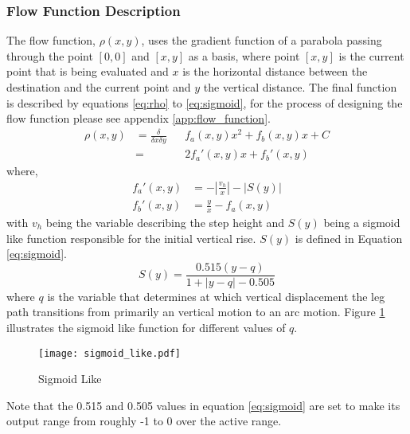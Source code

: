             \subsubsection{Flow Function Description} \label{sec:flow_function}
                The flow function, \(\rho(x,y)\), uses the gradient function of a parabola passing through the point \([0,0]\) and \([x,y]\) as a basis, where point \([x,y]\)
                is the current point that is being evaluated and \(x\) is the horizontal distance between the destination and the current point and \(y\) the
                vertical distance. The final function is described by equations \ref{eq:rho} to \ref{eq:sigmoid}, for the process of designing the flow function
                please see appendix \ref{app:flow_function}.
                \begin{equation} \label{eq:rho}
                    \begin{aligned}
                        \rho(x,y) &= \frac{\delta}{\delta x\delta y}&&f_a(x,y)x^2 + f_b(x,y)x + C\\
                        &= &&2f_a'(x,y)x + f_b'(x,y)    
                    \end{aligned}
                \end{equation}
                where, %
                \begin{align} \label{eq:fa}
                    f_a'(x,y) &= -\left|\frac{v_h}{x}\right| - \left|S(y)\right|\\
                    f_b'(x,y) &= \frac{y}{x} - f_a(x,y)
                \end{align}
                with \(v_h\) being the variable describing the step height and \(S(y)\) being a sigmoid like function 
                responsible for the initial vertical rise. \(S(y)\) is defined in Equation \ref{eq:sigmoid}.
                \begin{equation} \label{eq:sigmoid}
                    S(y) = \frac{0.515(y-q)}{1+\left|y-q\right|-0.505}
                \end{equation}
                where \(q\) is the variable that determines at which vertical displacement the leg path transitions from primarily an vertical motion to
                an arc motion. Figure \ref{fig:sigmoid_like} illustrates the sigmoid like function for different values of \(q\).
                \begin{figure}[h]
                    \centering
                    \hspace{-1.38cm}
                    \texttt{[image: sigmoid\_like.pdf]}
                    \caption{Sigmoid Like}
                    \label{fig:sigmoid_like}
                \end{figure}

                \noindent
                Note that the 0.515 and 0.505 values in equation \ref{eq:sigmoid} are set to make its output range from roughly -1 to 0 over the active range.
